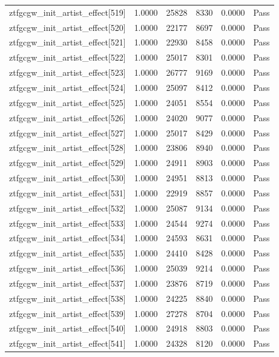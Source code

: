 \begin{table}[htbp]
\begin{tabular}{llrrll}
ztfgcgw\_init\_artist\_effect[519] & 1.0000 & 25828 & 8330 & 0.0000 & Pass \\
ztfgcgw\_init\_artist\_effect[520] & 1.0000 & 22177 & 8697 & 0.0000 & Pass \\
ztfgcgw\_init\_artist\_effect[521] & 1.0000 & 22930 & 8458 & 0.0000 & Pass \\
ztfgcgw\_init\_artist\_effect[522] & 1.0000 & 25017 & 8301 & 0.0000 & Pass \\
ztfgcgw\_init\_artist\_effect[523] & 1.0000 & 26777 & 9169 & 0.0000 & Pass \\
ztfgcgw\_init\_artist\_effect[524] & 1.0000 & 25097 & 8412 & 0.0000 & Pass \\
ztfgcgw\_init\_artist\_effect[525] & 1.0000 & 24051 & 8554 & 0.0000 & Pass \\
ztfgcgw\_init\_artist\_effect[526] & 1.0000 & 24020 & 9077 & 0.0000 & Pass \\
ztfgcgw\_init\_artist\_effect[527] & 1.0000 & 25017 & 8429 & 0.0000 & Pass \\
ztfgcgw\_init\_artist\_effect[528] & 1.0000 & 23806 & 8940 & 0.0000 & Pass \\
ztfgcgw\_init\_artist\_effect[529] & 1.0000 & 24911 & 8903 & 0.0000 & Pass \\
ztfgcgw\_init\_artist\_effect[530] & 1.0000 & 24951 & 8813 & 0.0000 & Pass \\
ztfgcgw\_init\_artist\_effect[531] & 1.0000 & 22919 & 8857 & 0.0000 & Pass \\
ztfgcgw\_init\_artist\_effect[532] & 1.0000 & 25087 & 9134 & 0.0000 & Pass \\
ztfgcgw\_init\_artist\_effect[533] & 1.0000 & 24544 & 9274 & 0.0000 & Pass \\
ztfgcgw\_init\_artist\_effect[534] & 1.0000 & 24593 & 8631 & 0.0000 & Pass \\
ztfgcgw\_init\_artist\_effect[535] & 1.0000 & 24410 & 8428 & 0.0000 & Pass \\
ztfgcgw\_init\_artist\_effect[536] & 1.0000 & 25039 & 9214 & 0.0000 & Pass \\
ztfgcgw\_init\_artist\_effect[537] & 1.0000 & 23876 & 8719 & 0.0000 & Pass \\
ztfgcgw\_init\_artist\_effect[538] & 1.0000 & 24225 & 8840 & 0.0000 & Pass \\
ztfgcgw\_init\_artist\_effect[539] & 1.0000 & 27278 & 8704 & 0.0000 & Pass \\
ztfgcgw\_init\_artist\_effect[540] & 1.0000 & 24918 & 8803 & 0.0000 & Pass \\
ztfgcgw\_init\_artist\_effect[541] & 1.0000 & 24328 & 8120 & 0.0000 & Pass \\

\end{tabular}
\end{table}
